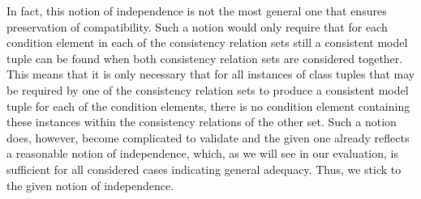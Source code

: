 In fact, this notion of independence is not the most general one that ensures preservation of compatibility.
Such a notion would only require that for each condition element in each of the consistency relation sets still a consistent model tuple can be found when both consistency relation sets are considered together.
This means that it is only necessary that for all instances of class tuples that may be required by one of the consistency relation sets to produce a consistent model tuple for each of the condition elements, there is no condition element containing these instances within the consistency relations of the other set.
Such a notion does, however, become complicated to validate and the given one already reflects a reasonable notion of independence, which, as we will see in our evaluation, is sufficient for all considered cases indicating general adequacy.
Thus, we stick to the given notion of independence.


